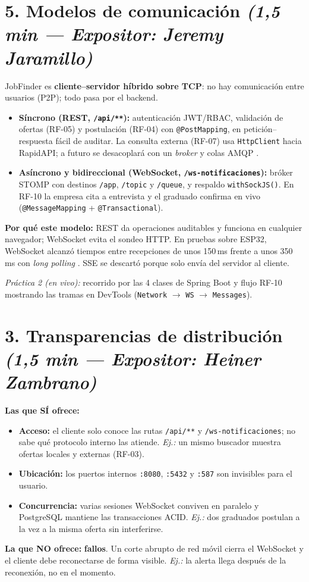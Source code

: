 \documentclass[11pt,a4paper]{article}
\newcommand{\expo}[2]{\hfill{\small\textit{(#1 — Expositor: #2)}}}
\begin{document}
\section*{5. Modelos de comunicación \expo{1,5 min}{Jeremy Jaramillo}}
JobFinder es \textbf{cliente--servidor híbrido sobre TCP}: no hay comunicación
entre usuarios (P2P); todo pasa por el backend.
\begin{itemize}
  \item \textbf{Síncrono (REST, \texttt{/api/**}):} autenticación JWT/RBAC,
        validación de ofertas (RF-05) y postulación (RF-04) con
        \texttt{@PostMapping}, en petición--respuesta fácil de auditar. La consulta
        externa (RF-07) usa \texttt{HttpClient} hacia RapidAPI; a futuro se
        desacoplará con un \textit{broker} y colas AMQP \cite{petrescu2025iotprotocols}.
  \item \textbf{Asíncrono y bidireccional (WebSocket, \texttt{/ws-notificaciones}):}
        bróker STOMP con destinos \texttt{/app}, \texttt{/topic} y \texttt{/queue},
        y respaldo \texttt{withSockJS()}. En RF-10 la empresa cita a entrevista y el
        graduado confirma en vivo (\texttt{@MessageMapping} + \texttt{@Transactional}).
\end{itemize}
\textbf{Por qué este modelo:} REST da operaciones auditables y funciona en
cualquier navegador; WebSocket evita el sondeo HTTP. En pruebas sobre ESP32,
WebSocket alcanzó tiempos entre recepciones de unos 150\,ms frente a unos 350\,ms
con \textit{long polling} \cite{mitrovic2023websocket}. SSE se descartó porque solo
envía del servidor al cliente.

\textit{Práctica 2 (en vivo):} recorrido por las 4 clases de Spring Boot y flujo
RF-10 mostrando las tramas en DevTools (\texttt{Network} $\rightarrow$
\texttt{WS} $\rightarrow$ \texttt{Messages}).

\section*{3. Transparencias de distribución \expo{1,5 min}{Heiner Zambrano}}
\textbf{Las que SÍ ofrece:}
\begin{itemize}
  \item \textbf{Acceso:} el cliente solo conoce las rutas \texttt{/api/**} y
        \texttt{/ws-notificaciones}; no sabe qué protocolo interno las atiende.
        \textit{Ej.:} un mismo buscador muestra ofertas locales y externas (RF-03).
  \item \textbf{Ubicación:} los puertos internos \texttt{:8080}, \texttt{:5432} y
        \texttt{:587} son invisibles para el usuario.
  \item \textbf{Concurrencia:} varias sesiones WebSocket conviven en paralelo y
        PostgreSQL mantiene las transacciones ACID. \textit{Ej.:} dos graduados
        postulan a la vez a la misma oferta sin interferirse.
\end{itemize}
\textbf{La que NO ofrece:} \textbf{fallos}. Un corte abrupto de red móvil cierra
el WebSocket y el cliente debe reconectarse de forma visible. \textit{Ej.:} la
alerta llega después de la reconexión, no en el momento.
\end{document}
